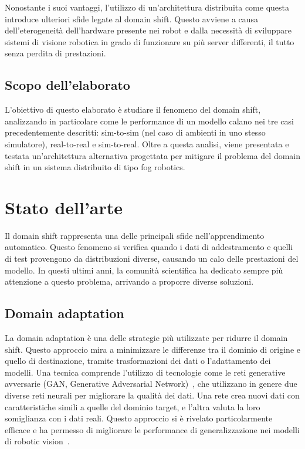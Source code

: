 \documentclass[12pt]{report}
\begin{document}
Nonostante i suoi vantaggi, l'utilizzo di un'architettura distribuita come questa introduce ulteriori sfide legate al domain shift. Questo avviene a causa dell'eterogeneità dell'hardware presente nei robot e dalla necessità di sviluppare sistemi di visione robotica in grado di funzionare su più server differenti, il tutto senza perdita di prestazioni.

\section{Scopo dell'elaborato}
\label{sec:scopo_dell_elaborato}

L'obiettivo di questo elaborato è studiare il fenomeno del domain shift, analizzando in particolare come le performance di un modello calano nei tre casi precedentemente descritti: sim-to-sim (nel caso di ambienti in uno stesso simulatore), real-to-real e sim-to-real. Oltre a questa analisi, viene presentata e testata un'architettura alternativa progettata per mitigare il problema del domain shift in un sistema distribuito di tipo fog robotics.

\chapter{Stato dell'arte}
\label{chap:stato_arte}

Il domain shift rappresenta una delle principali sfide nell'apprendimento automatico. Questo fenomeno si verifica quando i dati di addestramento e quelli di test provengono da distribuzioni diverse, causando un calo delle prestazioni del modello. In questi ultimi anni, la comunità scientifica ha dedicato sempre più attenzione a questo problema, arrivando a proporre diverse soluzioni.

\section{Domain adaptation}
\label{sec:adaptation}

La domain adaptation è una delle strategie più utilizzate per ridurre il domain shift. Questo approccio mira a minimizzare le differenze tra il dominio di origine e quello di destinazione, tramite trasformazioni dei dati o l'adattamento dei modelli. Una tecnica comprende l'utilizzo di tecnologie come le reti generative avversarie (GAN, Generative Adversarial Network)~\cite{10.1145/3422622}, che utilizzano in genere due diverse reti neurali per migliorare la qualità dei dati. Una rete crea nuovi dati con caratteristiche simili a quelle del dominio target, e l'altra valuta la loro somiglianza con i dati reali. Questo approccio si è rivelato particolarmente efficace e ha permesso di migliorare le performance di generalizzazione nei modelli di robotic vision~\cite{Shrivastava_2017_CVPR}.
\end{document}
